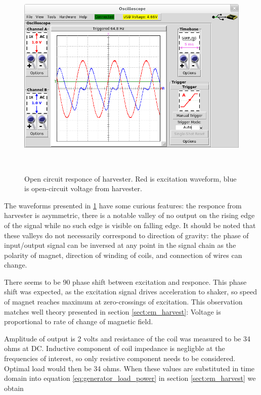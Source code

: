 \begin{figure}[htb]
\begin{center}
\includegraphics[height=10cm]{images/own_measurement/generator_shaker/inductive_td_open_65hz_dry.png}
\end{center}
\caption{\label{fig:inductive_65_open_dry} Open circuit responce of harvester. Red is excitation waveform, blue is open-circuit voltage from harvester.}
\end{figure}

The waveforms presented in \ref{fig:inductive_65_open_dry} have some curious features: the responce from harvester is asymmetric, there is a notable valley of no output on the rising edge of the signal while no such edge is visible on falling edge. It should be noted that these valleys do not necessarily correspond to direction of gravity: the phase of input/output signal can be inversed at any point in the signal chain as the polarity of magnet, direction of winding of coils, and connection of wires can change.

There seems to be 90 \degree phase shift between excitation and responce. This phase shift was expected, as the excitation signal drives acceleration to shaker, so speed of magnet reaches maximum at zero-crossings of excitation. This observation matches well theory presented in section \ref{sect:em_harvest}: Voltage is proportional to rate of change of magnetic field. 

Amplitude of output is 2 volts and resistance of the coil was measured to be 34 ohms at DC. Inductive component of coil impedance is negligble at the frequencies of interest, so only resistive component needs to be considered. Optimal load would then be 34 ohms. When these values are substituted in time domain into equation \ref{eq:generator_load_power} in section \ref{sect:em_harvest} we obtain

